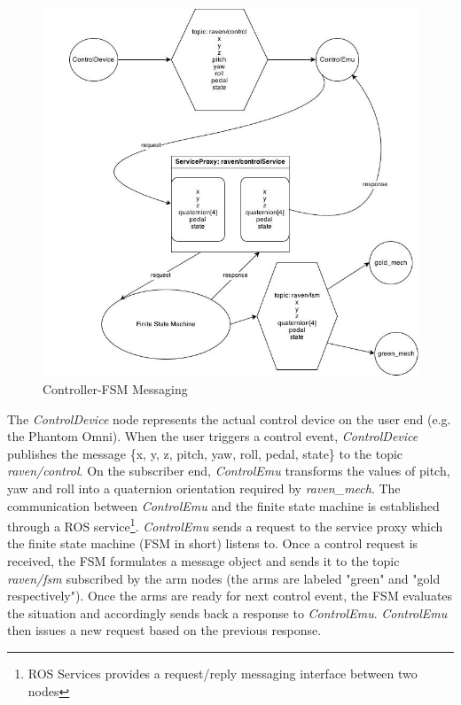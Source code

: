 \documentclass[letterpaper,twocolumn,10pt]{article}
\begin{document}
\begin{figure}[h]
  \includegraphics[width=1.0\columnwidth]{ControlDiagram.jpg}
  \caption{Controller-FSM Messaging}
  \label{fig:control_diagram}
\end{figure}

The \emph{ControlDevice} node represents the actual control device on
the user end (e.g. the Phantom Omni). When the user triggers a control
event, \emph{ControlDevice} publishes the message \{x, y, z, pitch,
yaw, roll, pedal, state\} to the topic \emph{raven/control}. On the
subscriber end, \emph{ControlEmu} transforms the values of pitch, yaw
and roll into a quaternion orientation required by
\emph{raven\_mech}. The communication between \emph{ControlEmu} and
the finite state machine is established through a ROS
service\footnote{ROS Services provides a request/reply messaging
  interface between two nodes}. \emph{ControlEmu} sends a request to
the service proxy which the finite state machine (FSM in short)
listens to. Once a control request is received, the FSM formulates a
message object and sends it to the topic \emph{raven/fsm} subscribed
by the arm nodes (the arms are labeled "green" and "gold
respectively"). Once the arms are ready for next control event, the
FSM evaluates the situation and accordingly sends back a response to
\emph{ControlEmu}. \emph{ControlEmu} then issues a new request based
on the previous response.
\end{document}
